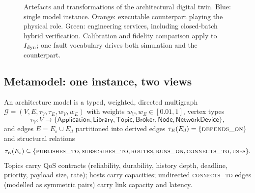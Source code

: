\begin{figure}[t]
{}
\caption{Artefacts and transformations of the architectural digital twin. Blue: single model instance. Orange: executable counterpart playing the physical role. Green: engineering services, including closed-batch hybrid verification. Calibration and fidelity comparison apply to $I_{\mathrm{dyn}}$; one fault vocabulary drives both simulation and the counterpart.}
\label{fig:architecture}
\end{figure}

\subsection{Metamodel: one instance, two views}
\label{sec:metamodel}

\begin{definition}
An architecture model is a typed, weighted, directed multigraph $\mathcal{G} = (V, E, \tau_V, \tau_E, w_V, w_E)$ with weights $w_V, w_E \in [0.01, 1]$, vertex types
\[\tau_V : V \to \{\textsf{Application}, \textsf{Library}, \textsf{Topic}, \textsf{Broker}, \textsf{Node}, \textsf{NetworkDevice}\},\]
and edges $E = E_s \cup E_d$ partitioned into derived edges $\tau_E(E_d) = \{\textsc{depends\_on}\}$ and structural relations
\[\tau_E(E_s) \subseteq \{\textsc{publishes\_to}, \textsc{subscribes\_to}, \textsc{routes}, \textsc{runs\_on}, \textsc{connects\_to}, \textsc{uses}\}.\]
Topics carry QoS contracts (reliability, durability, history depth, deadline, priority, payload size, rate); hosts carry capacities; undirected \textsc{connects\_to} edges (modelled as symmetric pairs) carry link capacity and latency.
\end{definition}

